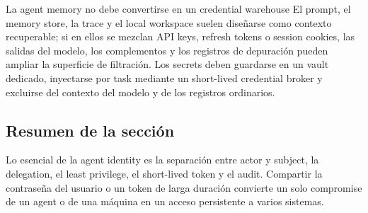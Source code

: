 \begin{warningbox}{La agent memory no debe convertirse en un credential warehouse}
El prompt, el memory store, la trace y el local workspace suelen diseñarse como contexto recuperable; si en ellos se mezclan API keys, refresh tokens o session cookies, las salidas del modelo, los complementos y los registros de depuración pueden ampliar la superficie de filtración. Los secrets deben guardarse en un vault dedicado, inyectarse por task mediante un short-lived credential broker y excluirse del contexto del modelo y de los registros ordinarios.
\end{warningbox}

\subsection{Resumen de la sección}

Lo esencial de la agent identity es la separación entre actor y subject, la delegation, el least privilege, el short-lived token y el audit. Compartir la contraseña del usuario o un token de larga duración convierte un solo compromise de un agent o de una máquina en un acceso persistente a varios sistemas.
